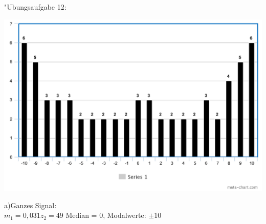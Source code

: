 

	"Ubungsaufgabe 12: \newline
	
	\includegraphics[scale=0.4]{A12_Histo.png}
	
	a)Ganzes Signal:\\
	$m_1 = 0,031		z_2 = 49$ \hspace{1cm}
	Median = 0,	Modalwerte: $\pm $10
	
